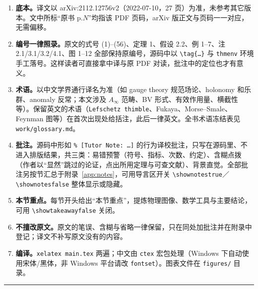 \documentclass[11pt,a4paper,UTF8,fontset=windows]{ctexart}
\newif\ifshowtakeaway \showtakeawaytrue   %
\newif\ifshownotes    \shownotestrue      %
\begin{document}
\begin{enumerate}
  \item \textbf{底本。}译文以 arXiv:2112.12756v2（2022-07-10，27 页）为准，未参考其它版本。文中所标“原书 p.$N$”均指该 PDF 页码，arXiv 版正文与页码一一对应，无需偏移。
  \item \textbf{编号一律照录。}原文的式号 (1)--(56)、定理 1、假设 2.2、例 1--7、注 2.1/3.1/3.2/4.1、图 1--12 全部保持原编号，源码中以 \verb|\tag{…}| 与 \verb|thmenv| 环境手工落号。这样读者可直接拿中译与原 PDF 对读，批注中的定位也才有意义。
  \item \textbf{术语。}以中文学界通行译名为准（如 gauge theory 规范场论、holonomy 和乐群、anomaly 反常；本文涉及 $A_\infty$ 范畴、BV 形式、有效作用量、横截性等）。保留英文的术语（\verb|Lefschetz thimble|、Fukaya、Morse--Smale、Feynman 图等）在首次出现处给括注，此后一律英文。全书术语冻结表见 \verb|work/glossary.md|。
  \item \textbf{批注。}源码中形如 \verb|% [Tutor Note: …]| 的行为译校批注，只写在源码里、不进入排版结果，共三类：易错预警（符号、指标、次数、约定）、含糊点拨（作者以“显然”跳过的论证，点出所用定理与可查文献）、背景直觉。全部批注另按节汇总于附录~\ref{app:notes}，可用导言区开关 \verb|\shownotestrue|／\verb|\shownotesfalse| 整体显示或隐藏。
  \item \textbf{本节重点。}每节开头给出“本节重点”，提炼物理图像、数学工具与主要结论，可用 \verb|\showtakeawayfalse| 关闭。
  \item \textbf{不擅改原文。}原文的笔误、含糊与省略一律保留，只在同处加批注并在附录中登记；译文不补写原文没有的内容。
  \item \textbf{编译。}\verb|xelatex main.tex| 两遍；中文由 \verb|ctex| 宏包处理（Windows 下自动使用宋体/黑体，非 Windows 平台请改 \verb|fontset|）。图表文件在 \verb|figures/| 目录。
\end{enumerate}

\medskip
\noindent\rule{\linewidth}{0.4pt}

\tableofcontents
\newpage











\appendix
\ifshownotes
  
\fi
\end{document}
